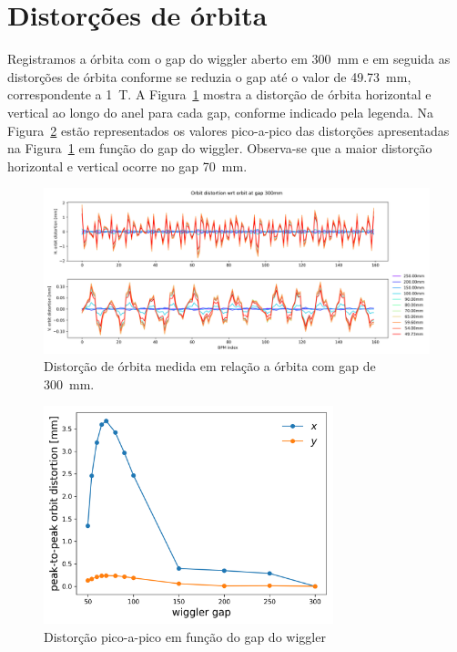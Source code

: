 \documentclass[a4paper,
               keeplastbox,   %
               ]{jacow}
\begin{document}
\section{Distorções de órbita}
Registramos a órbita com o gap do wiggler aberto em \SI{300}{\milli\meter} e em seguida as distorções de órbita conforme se reduzia o gap até o valor de \SI{49.73}{\milli\meter}, correspondente a \SI{1}{\tesla}. A Figura~\ref{fig:dist1} mostra a distorção de órbita horizontal e vertical ao longo do anel para cada gap, conforme indicado pela legenda. Na Figura~\ref{fig:dist2} estão representados os valores pico-a-pico das distorções apresentadas na Figura~\ref{fig:dist1} em função do gap do wiggler. Observa-se que a maior distorção horizontal e vertical ocorre no gap \SI{70}{\milli\meter}.
\begin{figure}[!h]
    \centering
    \includegraphics*[width=\textwidth]{orbit_distortion_gap_wiggler.png}
    \caption{Distorção de órbita medida em relação a órbita com gap de \SI{300}{\milli\meter}.}
    \label{fig:dist1}
\end{figure}
\begin{figure}[!h]
    \centering
    \includegraphics[width=0.75\textwidth]{orbit_distortion_ptp_vs_gap_wiggler.png}
    \caption{Distorção pico-a-pico em função do gap do wiggler}
    \label{fig:dist2}
\end{figure}
\end{document}
